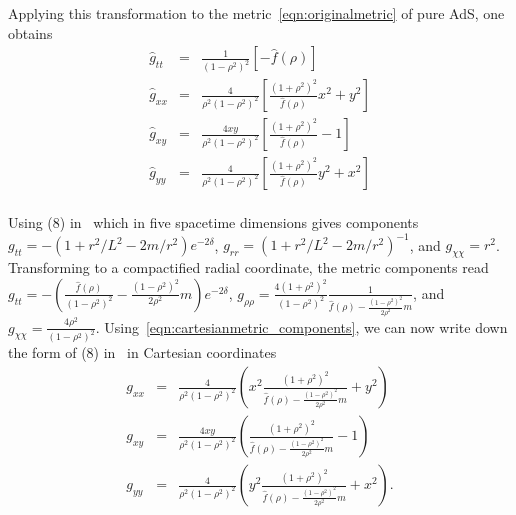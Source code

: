 \documentclass[prl,twocolumn,superscriptaddress]{revtex4-1}
\begin{document}
Applying this transformation to the metric~\eqref{eqn:originalmetric} of pure AdS, one obtains
\begin{eqnarray}\label{eqn:ads_cartesianmetric_components}
\hat{g}_{tt} &=& \frac{1}{(1-\rho^2)^2} \left[ -\hat{f}(\rho) \right] \nonumber \\
\hat{g}_{xx} &=& \frac{4}{\rho^2(1-\rho^2)^2} \left[ \frac{(1+\rho^2)^2}{\hat{f}(\rho)} x^2 + y^2 \right] \nonumber \\
\hat{g}_{xy} &=& \frac{4xy}{\rho^2(1-\rho^2)^2} \left[ \frac{(1+\rho^2)^2}{\hat{f}(\rho)} - 1 \right] \nonumber \\
\hat{g}_{yy} &=& \frac{4}{\rho^2(1-\rho^2)^2} \left[ \frac{(1+\rho^2)^2}{\hat{f}(\rho)} y^2 + x^2 \right] \nonumber \\
\end{eqnarray}

Using (8) in~\cite{Astefanesei:2003qy} which in five spacetime dimensions gives components $g_{tt}=-\left( 1+r^2/L^2-2m/r^2\right) e^{-2\delta}$, $g_{rr}=\left( 1+r^2/L^2-2m/r^2\right)^{-1}$, and $g_{\chi\chi}=r^2$.
Transforming to a compactified radial coordinate, the metric components read $g_{tt}=-\left( \frac{\hat{f}(\rho)}{(1-\rho^2)^2} - \frac{(1-\rho^2)^2}{2\rho^2} m \right) e^{-2\delta}$, $g_{\rho\rho}=\frac{4(1+\rho^2)^2}{(1-\rho^2)^2} \frac{1}{\hat{f}(\rho) - \frac{(1-\rho^2)^2}{2\rho^2} m}$, and $g_{\chi\chi}=\frac{4\rho^2}{(1-\rho^2)^2}$.
Using~\eqref{eqn:cartesianmetric_components}, we can now write down the form of (8) in~\cite{Astefanesei:2003qy} in Cartesian coordinates
\begin{eqnarray}\label{eqn:full_cartesianmetric_components}
g_{xx} &=& \frac{4}{\rho^2(1-\rho^2)^2} \left( x^2 \frac{(1+\rho^2)^2}{\hat{f}(\rho) - \frac{(1-\rho^2)^2}{2\rho^2} m} + y^2 \right) \nonumber \\
g_{xy} &=& \frac{4xy}{\rho^2(1-\rho^2)^2} \left( \frac{(1+\rho^2)^2}{\hat{f}(\rho) - \frac{(1-\rho^2)^2}{2\rho^2} m} - 1 \right) \nonumber \\
g_{yy} &=& \frac{4}{\rho^2(1-\rho^2)^2} \left( y^2 \frac{(1+\rho^2)^2}{\hat{f}(\rho) - \frac{(1-\rho^2)^2}{2\rho^2} m} + x^2 \right).
\end{eqnarray}
\end{document}
